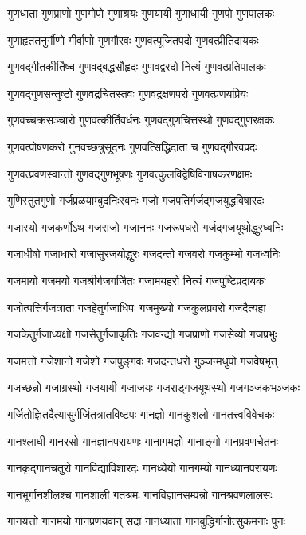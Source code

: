\twolineshloka
{गुणधाता गुणप्राणो गुणगोपो गुणाश्रयः}%
{गुणयायी गुणाधायी गुणपो गुणपालकः}%

\twolineshloka
{गुणाहृततनुर्गौणो गीर्वाणो गुणगौरवः}%
{गुणवत्पूजितपदो गुणवत्प्रीतिदायकः}%

\twolineshloka
{गुणवद्गीतकीर्तिष्च गुणवद्बद्धसौहृदः}%
{गुणवद्वरदो नित्यं गुणवत्प्रतिपालकः}%

\twolineshloka
{गुणवद्गुणसन्तुष्टो गुणवद्रचितस्तवः}%
{गुणवद्रक्षणपरो गुणवत्प्रणयप्रियः}%

\twolineshloka
{गुणवच्चक्रसञ्चारो गुणवत्कीर्तिवर्धनः}%
{गुणवद्गुणचित्तस्थो गुणवद्गुणरक्षकः}%

\twolineshloka
{गुणवत्पोषणकरो गुनवच्छत्रुसूदनः}%
{गुणवत्सिद्धिदाता च गुणवद्गौरवप्रदः}%

\twolineshloka
{गुणवत्प्रवणस्वान्तो गुणवद्गुणभूषणः}%
{गुणवत्कुलविद्वेषिविनाषकरणक्षमः}%

\twolineshloka
{गुणिस्तुतगुणो गर्जप्रळयाम्बुदनिःस्वनः}%
{गजो गजपतिर्गर्जद्गजयुद्धविषारदः}%

\twolineshloka
{गजास्यो गजकर्णोऽथ गजराजो गजाननः}%
{गजरूपधरो गर्जद्गजयूथोद्धुरध्वनिः}%

\twolineshloka
{गजाधीषो गजाधारो गजासुरजयोद्धुरः}%
{गजदन्तो गजवरो गजकुम्भो गजध्वनिः}%

\twolineshloka
{गजमायो गजमयो गजश्रीर्गजगर्जितः}%
{गजामयहरो नित्यं गजपुष्टिप्रदायकः}%

\twolineshloka
{गजोत्पत्तिर्गजत्राता गजहेतुर्गजाधिपः}%
{गजमुख्यो गजकुलप्रवरो गजदैत्यहा}%

\twolineshloka
{गजकेतुर्गजाध्यक्षो गजसेतुर्गजाकृतिः}%
{गजवन्द्यो गजप्राणो गजसेव्यो गजप्रभुः}%

\twolineshloka
{गजमत्तो गजेशानो गजेशो गजपुङ्गवः}%
{गजदन्तधरो गुञ्जन्मधुपो गजवेषभृत्}%

\twolineshloka
{गजच्छन्नो गजाग्रस्थो गजयायी गजाजयः}%
{गजराड्गजयूथस्थो गजगञ्जकभञ्जकः}%

\twolineshloka
{गर्जितोज्ञितदैत्यासुर्गर्जितत्रातविष्टपः}%
{गानज्ञो गानकुशलो गानतत्त्वविवेचकः}%

\twolineshloka
{गानश्लाघी गानरसो गानज्ञानपरायणः}%
{गानागमज्ञो गानाङ्गो गानप्रवणचेतनः}%

\twolineshloka
{गानकृद्गानचतुरो गानविद्याविशारदः}%
{गानध्येयो गानगम्यो गानध्यानपरायणः}%

\twolineshloka
{गानभूर्गानशीलश्च गानशाली गतश्रमः}%
{गानविज्ञानसम्पन्नो गानश्रवणलालसः}%

\twolineshloka
{गानयत्तो गानमयो गानप्रणयवान् सदा}%
{गानध्याता गानबुद्धिर्गानोत्सुकमनाः पुनः}%

